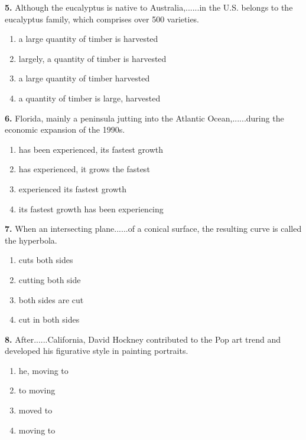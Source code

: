 \documentclass[12pt]{article}
\begin{document}
\par
\vspace{0.25\baselineskip}
\noindent\textbf{5.} Although the eucalyptus is native to Australia,......in the U.S. belongs to the eucalyptus family, which comprises over 500 varieties.
\begin{enumerate}[label=(\Alph*),leftmargin=*,itemsep=0.2em]
\item a large quantity of timber is harvested
\item largely, a quantity of timber is harvested
\item a large quantity of timber harvested
\item a quantity of timber is large, harvested
\end{enumerate}
\par
\vspace{0.25\baselineskip}
\noindent\textbf{6.} Florida, mainly a peninsula jutting into the Atlantic Ocean,......during the economic expansion of the 1990s.
\begin{enumerate}[label=(\Alph*),leftmargin=*,itemsep=0.2em]
\item has been experienced, its fastest growth
\item has experienced, it grows the fastest
\item experienced its fastest growth
\item its fastest growth has been experiencing
\end{enumerate}
\par
\vspace{0.25\baselineskip}
\noindent\textbf{7.} When an intersecting plane......of a conical surface, the resulting curve is called the hyperbola.
\begin{enumerate}[label=(\Alph*),leftmargin=*,itemsep=0.2em]
\item cuts both sides
\item cutting both side
\item both sides are cut
\item cut in both sides
\end{enumerate}
\par
\vspace{0.25\baselineskip}
\noindent\textbf{8.} After......California, David Hockney contributed to the Pop art trend and developed his figurative style in painting portraits.
\begin{enumerate}[label=(\Alph*),leftmargin=*,itemsep=0.2em]
\item he, moving to
\item to moving
\item moved to
\item moving to
\end{enumerate}
\end{document}

